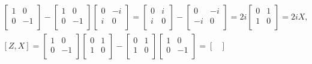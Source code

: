\documentclass[a4paper,12pt]{article}
\begin{document}
\begin{gather}
\begin{bmatrix}
            1 & 0\\
            0 & -1\\
        \end{bmatrix}
        -
        \begin{bmatrix}
            1 & 0\\
            0 & -1\\
        \end{bmatrix}
        \begin{bmatrix}
            0 & -i\\
            i & 0\\
        \end{bmatrix}
        =
        \begin{bmatrix}
            0 & i\\
            i & 0\\
        \end{bmatrix}
        -
        \begin{bmatrix}
            0 & -i\\
            -i & 0\\
        \end{bmatrix}
        =
        2i
        \begin{bmatrix}
            0 & 1\\
            1 & 0\\
        \end{bmatrix}
        = 2i X \textrm{,} \\
        [Z, X] =
        \begin{bmatrix}
            1 & 0\\
            0 & -1\\
        \end{bmatrix}
        \begin{bmatrix}
            0 & 1\\
            1 & 0\\
        \end{bmatrix}
        -
        \begin{bmatrix}
            0 & 1\\
            1 & 0\\
        \end{bmatrix}
        \begin{bmatrix}
            1 & 0\\
            0 & -1\\
        \end{bmatrix}
        =
        \begin{bmatrix}

\end{bmatrix}
\end{gather}
\end{document}

